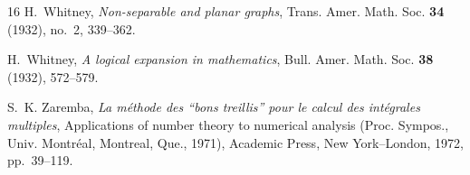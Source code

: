 \documentclass[A4paper,reqno,oneside,12pt]{amsart}
\theoremstyle{plain}
\theoremstyle{definition}
\begin{document}
\begin{thebibliography}{16}
H.~Whitney, \emph{Non-separable and planar graphs}, Trans. Amer. Math. Soc. {\bf 34} (1932), no.~2, 339--362.

H.~Whitney,
\emph{A logical expansion in mathematics},
Bull. Amer. Math. Soc. \textbf{38} (1932), 572--579.



S.~K. Zaremba,
\emph{La m\'ethode des ``bons treillis'' pour le calcul des int\'egrales multiples},
Applications of number theory to numerical analysis (Proc. Sympos., Univ. Montr\'eal, Montreal, Que., 1971),
Academic Press, New York--London, 1972, pp.~39--119.

\end{thebibliography}
\end{document}
